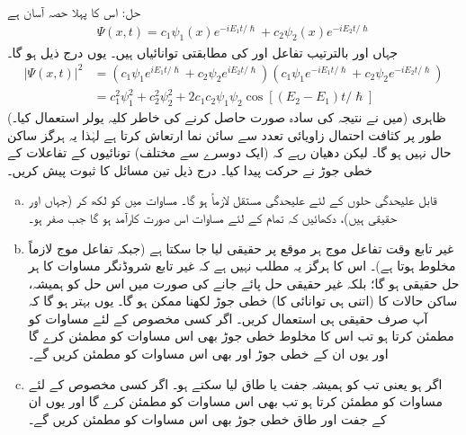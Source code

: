 حل:\quad
اس کا پہلا حصہ آسان ہے
\begin{align*}
\Psi (x,t) = c_{1} \psi_{1}(x)e^{-iE_{1}t/\hslash} + c_{2} \psi_{2}(x)e^{-iE_{2}t/\hslash}
\end{align*}
جہاں   اور   بالترتیب تفاعل   اور   کی مطابقتی توانائیاں ہیں۔ یوں درج ذیل ہو گا۔ 
\begin{align*}
\left| \Psi (x,t) \right|^{2} &= \left( c_{1} \psi_{1} e^{iE_{1}t/\hslash} + c_{2} \psi_{2} e^{iE_{2}t/\hslash} \right) \left( c_{1} \psi_{1} e^{-iE_{1}t/\hslash} + c_{2} \psi_{2} e^{-iE_{2}t/\hslash} \right) \\
&= c_{1}^{2} \psi_{1}^{2} + c_{2}^{2} \psi_{2}^{2} + 2c_{1}c_{2}\psi_{1}\psi_{2} \cos [ ( E_{2} - E_{1})t/\hslash]
\end{align*}
(میں نے نتیجہ کی سادہ صورت حاصل کرنے کی خاطر کلیہ یولر  استعمال کیا۔)  ظاہری طور پر  کثافت احتمال زاویائی تعدد  سے سائن نما ارتعاش کرتا ہے لہٰذا یہ ہرگز ساکن حال نہیں ہو گا۔ لیکن دھیان رہے کہ (ایک دوسرے سے مختلف) تونائیوں کے تفاعلات کے خطی جوڑ نے حرکت پیدا کیا۔ 
درج ذیل تین مسائل کا ثبوت پیش کریں۔
\begin{enumerate}[a.]
\item
قابل علیحدگی حلوں کے لئے علیحدگی مستقل  لازماً  ہو گا۔  مساوات  میں  کو  لکھ کر (جہاں  اور  حقیقی ہیں)،  دکھائیں کہ تمام  کے لئے مساوات   اس صورت کارآمد ہو گا جب  صفر ہو۔ 
\item
غیر تابع وقت تفاعل موج   ہر موقع پر حقیقی لیا جا سکتا ہے (جبکہ تفاعل موج  لازماً مخلوط ہوتا ہے)۔ اس کا  ہرگز یہ مطلب نہیں ہے کہ غیر تابع شروڈنگر مساوات کا ہر حل حقیقی ہو گا؛ بلکہ غیر حقیقی حل پائے جانے کی صورت میں اس حل کو ہمیشہ،  ساکن حالات کا (اتنی ہی توانائی کا) خطی جوڑ لکھنا ممکن ہو گا۔  یوں بہتر ہو گا کہ آپ صرف حقیقی  ہی استعمال کریں۔  اگر کسی مخصوص  کے لئے   مساوات  کو مطمئن کرتا ہو تب اس کا مخلوط خطی جوڑ  بھی اس مساوات کو مطمئن کرے گا اور یوں ان کے خطی جوڑ  اور  بھی اس مساوات کو مطمئن کریں گے۔
\item
اگر   ہو یعنی  تب  کو ہمیشہ جفت یا طاق لیا سکتے ہو۔  اگر کسی مخصوص  کے لئے   مساوات  کو مطمئن کرتا ہو تب   بھی اس مساوات کو مطمئن کرے گا اور یوں ان کے جفت اور طاق خطی جوڑ   بھی اس مساوات کو مطمئن کریں گے۔ 
\end{enumerate}
